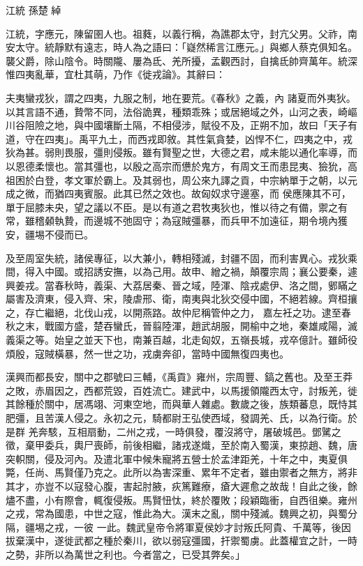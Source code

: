 
\begin{pinyinscope}
江統
 孫楚
 綽



 江統，字應元，陳留圉人也。祖蕤，以義行稱，為譙郡太守，封亢父男。父祚，南安太守。統靜默有遠志，時人為之語曰：「嶷然稀言江應元。」與鄉人蔡克俱知名。襲父爵，除山陰令。時關隴、屢為氐、羌所擾，孟觀西討，自擒氐帥齊萬年。統深惟四夷亂華，宜杜其萌，乃作《徙戎論》。其辭曰：



 夫夷蠻戎狄，謂之四夷，九服之制，地在要荒。《春秋》之義，內
 諸夏而外夷狄。以其言語不通，贄幣不同，法俗詭異，種類乖殊；或居絕域之外，山河之表，崎嶇川谷阻險之地，與中國壤斷土隔，不相侵涉，賦役不及，正朔不加，故曰「天子有道，守在四夷」。禹平九土，而西戎即敘。其性氣貪婪，凶悍不仁，四夷之中，戎狄為甚。弱則畏服，彊則侵叛。雖有賢聖之世，大德之君，咸未能以通化率導，而以恩德柔懷也。當其彊也，以殷之高宗而憊於鬼方，有周文王而患昆夷、獫狁，高祖困於白登，孝文軍於霸上。及其弱也，周公來九譯之貢，中宗納單于之朝，以元成之微，而猶四夷賓服。此其已然之效也。故匈奴求守邊塞，而
 侯應陳其不可，單于屈膝未央，望之議以不臣。是以有道之君牧夷狄也，惟以待之有備，禦之有常，雖稽顙執贄，而邊城不弛固守；為寇賊彊暴，而兵甲不加遠征，期令境內獲安，疆埸不侵而已。



 及至周室失統，諸侯專征，以大兼小，轉相殘滅，封疆不固，而利害異心。戎狄乘間，得入中國。或招誘安撫，以為己用。故申、繒之禍，顛覆宗周；襄公要秦，遽興姜戎。當春秋時，義渠、大荔居秦、晉之域，陸渾、陰戎處伊、洛之間，鄋瞞之屬害及濟東，侵入齊、宋，陵虐邢、衛，南夷與北狄交侵中國，不絕若線。齊桓攘之，存亡繼絕，北伐山戎，以開燕路。故仲尼稱管仲之力，
 嘉左衽之功。逮至春秋之末，戰國方盛，楚吞蠻氏，晉翦陸渾，趙武胡服，開榆中之地，秦雄咸陽，滅義渠之等。始皇之並天下也，南兼百越，北走匈奴，五嶺長城，戎卒億計。雖師役煩殷，寇賊橫暴，然一世之功，戎虜奔卻，當時中國無復四夷也。



 漢興而都長安，關中之郡號曰三輔，《禹貢》雍州，宗周豐、鎬之舊也。及至王莽之敗，赤眉因之，西都荒毀，百姓流亡。建武中，以馬援領隴西太守，討叛羌，徙其餘種於關中，居馮翊、河東空地，而與華人雜處。數歲之後，族類蕃息，既恃其肥彊，且苦漢人侵之。永初之元，騎都尉王弘使西域，發調羌、氏，以為行衛。於是群
 羌奔駭，互相扇動，二州之戎，一時俱發，覆沒將守，屠破城邑。鄧騭之徵，棄甲委兵，輿尸喪師，前後相繼，諸戎遂熾，至於南入蜀漢，東掠趙、魏，唐突軹關，侵及河內。及遣北軍中候朱寵將五營士於孟津距羌，十年之中，夷夏俱斃，任尚、馬賢僅乃克之。此所以為害深重、累年不定者，雖由禦者之無方，將非其才，亦豈不以寇發心腹，害起肘腋，疢篤難療，瘡大遲愈之故哉！自此之後，餘燼不盡，小有際會，輒復侵叛。馬賢忸忲，終於覆敗；段穎臨衝，自西徂樂。雍州之戎，常為國患，中世之寇，惟此為大。漢末之亂，關中殘滅。魏興之初，與蜀分隔，疆埸之戎，一彼
 一此。魏武皇帝令將軍夏侯妙才討叛氏阿貴、千萬等，後因拔棄漢中，遂徙武都之種於秦川，欲以弱寇彊國，扞禦蜀虜。此蓋權宜之計，一時之勢，非所以為萬世之利也。今者當之，已受其弊矣。」




\end{pinyinscope}
